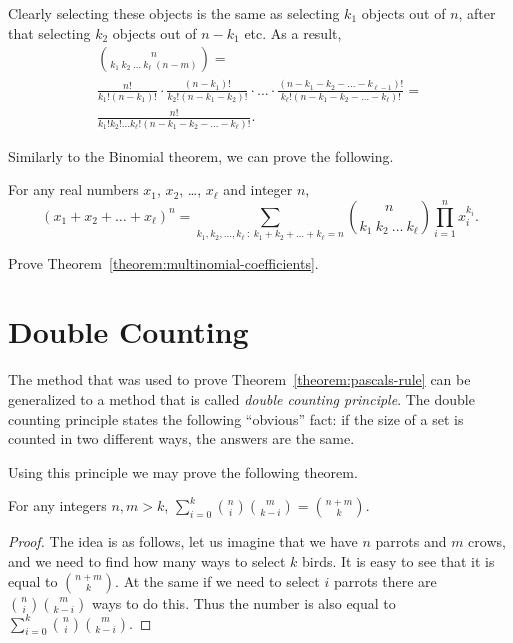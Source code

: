Clearly selecting these objects is the same as selecting $k_1$ objects out of
$n$, after that selecting $k_2$ objects out of $n - k_1$ etc. As a result,
\begin{multline*}
  \binom{n}{k_1 \ k_2 \ \dots \ k_\ell \ (n - m)} = \\
  \frac{n!}{k_1! (n - k_1)!} \cdot \frac{(n - k_1)!}{k_2! (n - k_1 - k_2)!}
  \cdot \ldots \cdot
  \frac{
    (n - k_1 - k_2 - \dots - k_{\ell - 1})!
  }{
    k_\ell! (n - k_1 - k_2 - \dots - k_\ell)!
  } = \\
  \frac{n!}{k_1! k_2! \dots k_\ell! (n - k_1 - k_2 - \dots - k_\ell)!}.
\end{multline*}

Similarly to the Binomial theorem, we can prove the following.
\begin{theorem}
\label{theorem:multinomial-coefficients}
  For any real numbers $x_1$, $x_2$, \dots, $x_\ell$ and integer $n$,
  \[
    (x_1 + x_2 + \dots + x_\ell)^n =
    \sum_{k_1, k_2, \dots, k_\ell ~:~ k_1 + k_2 + \dots + k_\ell = n}
      \binom{n}{k_1 \ k_2 \ \dots \ k_\ell} \prod_{i = 1}^n x_i^{k_i}.
  \]
\end{theorem}

\begin{exercise}
  Prove Theorem~\ref{theorem:multinomial-coefficients}.
\end{exercise}

\section{Double Counting}
The method that was used to prove Theorem~\ref{theorem:pascals-rule} can be
generalized to a method that is called \emph{double counting principle}.
The double counting principle states the following “obvious” fact: if the
size of a set is counted in two different ways, the answers are the same.

Using this principle we may prove the following theorem.
\begin{theorem}
  For any integers $n, m > k$,
  $\sum_{i = 0}^k \binom{n}{i} \binom{m}{k - i} = \binom{n + m}{k}$.
\end{theorem}
\begin{proof}
  The idea is as follows, let us imagine that we have $n$ parrots and $m$ crows,
  and we need to find how many ways to select $k$ birds.
  It is easy to see that it is equal to $\binom{n + m}{k}$. At the same
  if we need to select $i$ parrots there are $\binom{n}{i}\binom{m}{k - i}$
  ways to do this. Thus the number is also equal to
  $\sum_{i = 0}^k \binom{n}{i}\binom{m}{k - i}$.
\end{proof}

